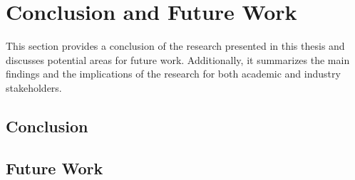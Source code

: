\chapter{Conclusion and Future Work}
This section provides a conclusion of the research presented in this thesis and discusses potential areas for future work. Additionally, it summarizes the main findings and the implications of the research for both academic and industry stakeholders.
\section{Conclusion}


\section{Future Work}
